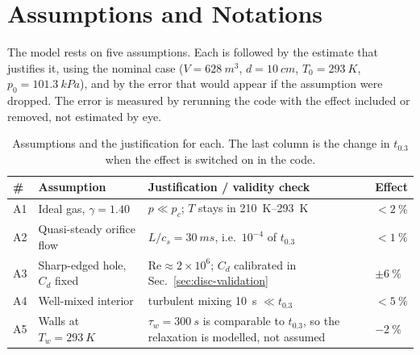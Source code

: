 \section{Assumptions and Notations}
\label{sec:assumptions}

The model rests on five assumptions. Each is followed by the estimate that
justifies it, using the nominal case ($V=\SI{628}{m^3}$, $d=\SI{10}{cm}$,
$T_0=\SI{293}{K}$, $p_0=\SI{101.3}{kPa}$), and by the error that would
appear if the assumption were dropped. The error is measured by rerunning
the code with the effect included or removed, not estimated by eye.

\begin{table}[htbp]
  \centering
  \small
  \setlength{\tabcolsep}{4pt}
  \renewcommand{\arraystretch}{1.15}
  \caption{Assumptions and the justification for each. The last column is
  the change in $t_{0.3}$ when the effect is switched on in the code.}
  \label{tab:assumptions}
  \begin{tabular}{@{}l p{} p{} >{\raggedleft\arraybackslash}p{}@{}}
    \toprule
    \# & Assumption & Justification / validity check & Effect \\
    \midrule
    A1 & Ideal gas, $\gamma=1.40$ &
         $p\ll p_c$; $T$ stays in \SI{210}{K}--\SI{293}{K} & $<\SI{2}{\percent}$ \\
    A2 & Quasi-steady orifice flow &
         $L/c_s=\SI{30}{ms}$, i.e.\ $10^{-4}$ of $t_{0.3}$ & $<\SI{1}{\percent}$ \\
    A3 & Sharp-edged hole, $C_d$ fixed &
         $\mathrm{Re}\approx2\times10^{6}$; $C_d$ calibrated in
         Sec.~\ref{sec:disc-validation} & $\pm\SI{6}{\percent}$ \\
    A4 & Well-mixed interior &
         turbulent mixing \SI{10}{s} $\ll t_{0.3}$ & $<\SI{5}{\percent}$ \\
    A5 & Walls at $T_w=\SI{293}{K}$ &
         $\tau_w=\SI{300}{s}$ is comparable to $t_{0.3}$, so the relaxation
         is modelled, not assumed & $-\SI{2}{\percent}$ \\
    \bottomrule
  \end{tabular}
\end{table}

